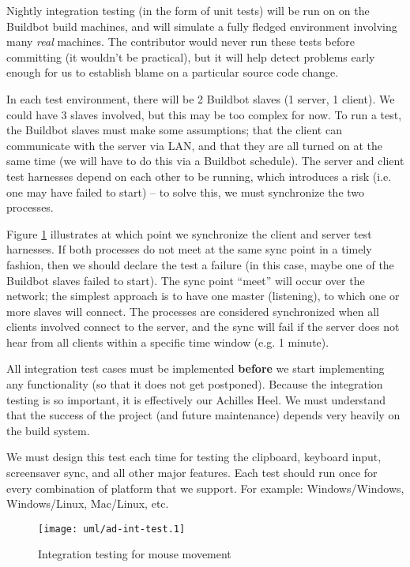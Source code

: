 Nightly integration testing (in the form of unit tests) will be run on on the 
Buildbot build machines, and will
simulate a fully fledged environment involving many \textit{real} machines. The 
contributor would never run these tests before committing (it wouldn't be 
practical), but it will help detect problems early enough for us to establish
blame on a particular source code change.

In each test environment, there will be 2 Buildbot slaves (1 server, 1 client).
We could have 3 slaves involved, but this may be too complex for now.
To run a test, the Buildbot slaves must make some assumptions; that the client
can communicate with the server via LAN, and that they are all turned on at the 
same time (we will have to do this via a Buildbot schedule). The server and 
client test harnesses depend on each other to be running, which introduces a
risk (i.e. one may have failed to start) -- to solve this, we must synchronize
the two processes.

Figure \ref{fig:integrationTesting} illustrates at which point we synchronize
the client and server test harnesses. If both processes do not meet at the same
sync point in a timely fashion, then we should declare the test a failure (in
this case, maybe one of the Buildbot slaves failed to start). The sync point
``meet'' will occur over the network; the simplest approach is to have one 
master (listening), to which one or more slaves will connect. The processes are
considered synchronized when all clients involved connect to the server, and
the sync will fail if the server does not hear from all clients within a 
specific time window (e.g. 1 minute).

All integration test cases must be implemented \textbf{before} we start 
implementing any functionality (so that it does not get postponed). Because the
integration testing is so important, it is effectively our 
Achilles Heel. We must understand that the success of the project (and future 
maintenance) depends very heavily on the build system.

We must design this test each time for testing the clipboard, keyboard input,
screensaver sync, and all other major features. Each test should run once for 
every combination of platform that we support. For example: Windows/Windows,
Windows/Linux, Mac/Linux, etc.

\begin{figure}[ht!]
  \centering
  \texttt{[image: uml/ad-int-test.1]}
  \caption{Integration testing for mouse movement}
  \label{fig:integrationTesting}
\end{figure}

